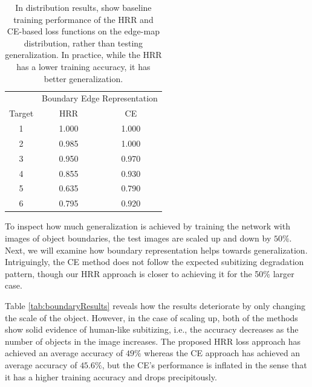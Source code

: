 \documentclass[letterpaper]{article} %
\begin{document}
\begin{table}[!htbp]%
\centering
\begin{tabular}{@{}ccc@{}}
\toprule
      & \multicolumn{2}{c}{Boundary Edge Representation} \\ \cmidrule(l){2-3}
Target & HRR           & CE            \\ \midrule
1      & 1.000         & 1.000         \\
2      & 0.985         & 1.000         \\
3      & 0.950         & 0.970         \\
4      & 0.855         & 0.930         \\
5      & 0.635         & 0.790         \\
6      & 0.795         & 0.920         \\ \bottomrule
\end{tabular}
\caption{In distribution results, show baseline training performance of the HRR and CE-based loss functions on the edge-map distribution, rather than testing generalization. In practice, while the HRR has a lower training accuracy, it has better generalization.}
\label{tbl:boundary_train}
\end{table}

To inspect how much generalization is achieved by training the network with images of object boundaries, the test images are scaled up and down by $50\%$. Next, we will examine how boundary representation helps towards generalization. Intriguingly, the CE method does not follow the expected subitizing degradation pattern, though our HRR approach is closer to achieving it for the 50\% larger case.
\par
Table \ref{tab:boundaryResults} reveals how the results deteriorate by only changing the scale of the object. However, in the case of scaling up, both of the methods show solid evidence of human-like subitizing, i.e., the accuracy decreases as the number of objects in the image increases. The proposed HRR loss approach has achieved an average accuracy of $49\%$ whereas the CE approach has achieved an average accuracy of $45.6\%$, but the CE's performance is inflated in the sense that it has a higher training accuracy and drops precipitously.
\end{document}
